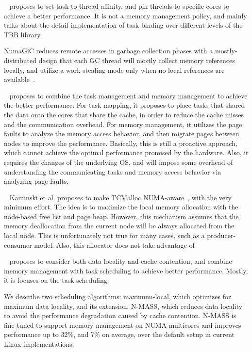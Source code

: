 ~\cite{Majo:2015:LPC:2688500.2688509} proposes to set task-to-thread affinity, and pin threads to specific cores to achieve a better performance. It is not a memory management policy, and mainly talks about the detail implementation of task binding over different levels of the TBB library. 

NumaGiC reduces remote accesses in garbage collection phases with a mostly-distributed design that each GC thread will mostly collect memory references locally, and utilize a work-stealing mode only when no local references are available~\cite{NumaGiC}.  


~\cite{diener2015automatic} proposes to combine the task management and memory management to achieve the better performance. For task mapping, it proposes to place tasks that shared the data onto the cores that share the cache, in order to reduce the cache misses and the communication overhead. For memory management, it utilizes the page faults to analyze the memory access behavior, and then migrate pages between nodes to improve the performance. Basically, this is still a proactive approach, which cannot achieve the optimal performance promised by the hardware. Also, it requires the changes of the underlying OS, and will impose some overhead of understanding the communicating tasks and memory access behavior via analyzing page faults.  

 
~\cite{1419934}
Kaminski et al. proposes to make TCMalloc NUMA-aware~\cite{tcmallocnew}, with the very minimum effort. The idea is to maximize the local memory allocation with the node-based free list and page heap. However, this mechanism assumes that the memory deallocation from the current node will be always allocated from the local node. This is unfortunately not true for many cases, such as a producer-consumer model. Also, this allocator does not take advantage of 

~\cite{Majo:2011:MMN:1993478.1993481} proposes to consider both data locality and cache contention, and combine memory management with task scheduling to achieve better performance. Mostly, it is focuses on the task scheduling. 
 
We describe two scheduling algorithms: maximum-local, which optimizes for maximum data locality, and its extension, N-MASS, which reduces data locality to avoid the performance degradation caused by cache contention. N-MASS is fine-tuned to support memory management on NUMA-multicores and improves performance up to 32\%, and 7\% on average, over the default setup in current Linux implementations.

